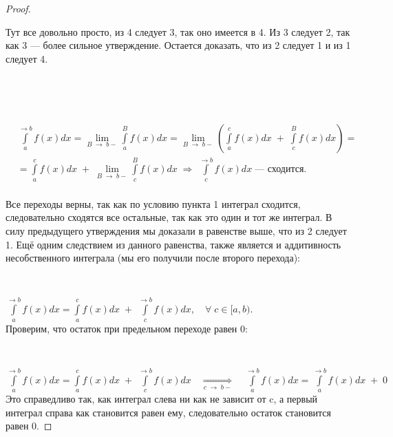 \documentclass[../main.tex]{subfiles}
\begin{document}
\newpage

\begin{proof}
    
    ~

    Тут все довольно просто, из 4 следует 3, так оно имеется в 4. Из 3 следует 2, так как 3 --- более сильное утверждение. Остается доказать, что из 2 следует 1 и из 1 следует 4.
    
    ~


    ~

    \(
    \begin{aligned}
        &\displaystyle\int\limits_{ a}^{ \rightarrow b} f(x)dx = \lim\limits_{ B \; \rightarrow \; b-} \displaystyle\int\limits_{ a}^{ B} f(x)dx = \lim\limits_{ B \; \rightarrow \; b-} ( \displaystyle\int\limits_{ a}^{ c} f(x)dx \; + \; \displaystyle\int\limits_{ c}^{ B} f(x)dx ) = \\[5pt] 
        & = \displaystyle\int\limits_{ a}^{ c} f(x)dx \; + \; \lim\limits_{ B \; \rightarrow \; b-} \displaystyle\int\limits_{ c}^{ B} f(x)dx \; \Rightarrow \; \displaystyle\int\limits_{ c}^{ \rightarrow b} f(x)dx \; \text{--- сходится.}  \\
    \end{aligned}
    \)
    
    Все переходы верны, так как по условию пункта 1 интеграл сходится, следовательно сходятся все остальные, так как это один и тот же интеграл. В силу предыдущего утверждения мы доказали в равенстве выше, что из 2 следует 1. Ещё одним следствием из данного равенства, также является и аддитивность несобственного интеграла (мы его получили после второго перехода):

    ~

    \( \displaystyle\int\limits_{a}^{ \rightarrow b} f(x)dx = \displaystyle\int\limits_{ a}^{ c} f(x)dx \; + \; \displaystyle\int\limits_{c}^{ \rightarrow b} f(x)dx,\quad \forall \; c \in [a, b).\) \\

    Проверим, что остаток при предельном переходе равен 0:

    ~

    \( \displaystyle\int\limits_{a}^{ \rightarrow b} f(x)dx = \displaystyle\int\limits_{ a}^{ c} f(x)dx \; + \; \displaystyle\int\limits_{ c}^{ \rightarrow b} f(x)dx\quad \underset{c \; \rightarrow \; b-}{\Longrightarrow} \quad \displaystyle\int\limits_{a}^{ \rightarrow b} f(x)dx = \displaystyle\int\limits_{ a}^{ \rightarrow b} f(x)dx \; + \; 0\)\\
    Это справедливо так, как интеграл слева ни как не зависит от c, а первый интеграл справа как становится равен ему, следовательно остаток становится равен 0.
    
\end{proof}
\end{document}
